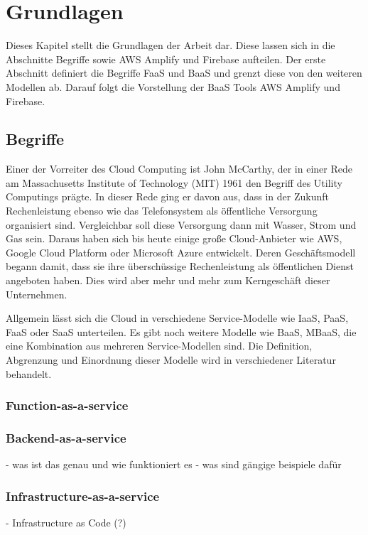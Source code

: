 \chapter{Grundlagen}

Dieses Kapitel stellt die Grundlagen der Arbeit dar. Diese lassen sich in die Abschnitte Begriffe sowie \ac{AWS} Amplify und Firebase aufteilen. Der erste Abschnitt definiert die Begriffe \ac{FaaS} und \ac{BaaS} und grenzt diese von den weiteren Modellen ab. Darauf folgt die Vorstellung der \acl{BaaS} Tools \ac{AWS} Amplify und Firebase.

\section{Begriffe}

Einer der Vorreiter des Cloud Computing ist John McCarthy, der in einer Rede am Massachusetts Institute of Technology (MIT) 1961 den Begriff des Utility Computings prägte. In dieser Rede ging er davon aus, dass in der Zukunft Rechenleistung ebenso wie das Telefonsystem als öffentliche Versorgung organisiert sind. Vergleichbar soll diese Versorgung dann mit Wasser, Strom und Gas sein. Daraus haben sich bis heute einige große Cloud-Anbieter wie \ac{AWS}, Google Cloud Platform oder Microsoft Azure entwickelt. Deren Geschäftsmodell begann damit, dass sie ihre überschüssige Rechenleistung als öffentlichen Dienst angeboten haben. Dies wird aber mehr und mehr zum Kerngeschäft dieser Unternehmen. \autocite{buyya2013mastering}

Allgemein lässt sich die Cloud in verschiedene Service-Modelle wie \ac{IaaS}, \ac{PaaS}, \ac{FaaS} oder \ac{SaaS} unterteilen. Es gibt noch weitere Modelle wie \ac{BaaS}, \ac{MBaaS}, die eine Kombination aus mehreren Service-Modellen sind. Die Definition, Abgrenzung und Einordnung dieser Modelle wird in verschiedener Literatur \autocite{jiang2020overview} \autocite{kumar2019serverless} \autocite{dahunsi2021commercial} behandelt.

  \subsection{Function-as-a-service}
  \subsection{Backend-as-a-service}
  - was ist das genau und wie funktioniert es
  - was sind gängige beispiele dafür
  \subsection{Infrastructure-as-a-service}
- Infrastructure as Code (?)

